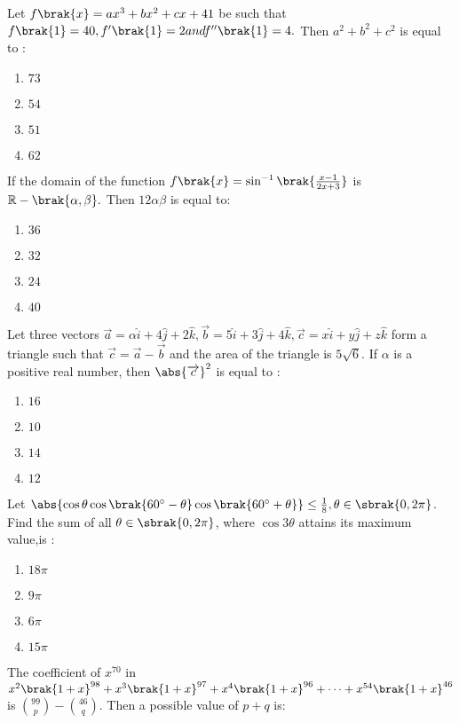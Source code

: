 \item Let $f\brak{x}=ax^3+bx^2+cx+41$ be such that $f\brak{1}=40, f'\brak{1}=2 and f''\brak{1}=4.$ Then $a^2+b^2+c^2$ is equal to : \hfill{}
     \begin{enumerate}
     \item $73$ \item $54$ \item $51$ \item $62$
     \end{enumerate}
\item If the domain of the function $f\brak{x}=\sin ^{-1} \brak{\frac{x-1}{2x+3}}$ is $\mathbb{R}-\brak{\alpha,\beta}.$ Then $12\alpha \beta$ is equal to: \hfill{}
     \begin{enumerate}
     \item $36$ \item $32$ \item $24$ \item $40$
     \end{enumerate}
\item Let three vectors $\overrightarrow{a}=\alpha \hat{i}+4\hat{j}+2\hat{k},\overrightarrow{b}=5\hat{i}+3\hat{j}+4\hat{k},\overrightarrow{c}=x\hat{i}+y\hat{j}+z\hat{k}$ form a triangle such that $\overrightarrow{c}=\overrightarrow{a}-\overrightarrow{b}$ and the area of the triangle is $5\sqrt{6}$. If $\alpha$ is a positive real number, then $\abs{\overrightarrow{c}}^2$ is equal to : \hfill{}
     \begin{enumerate}
     \item $16$ \item $10$ \item $14$ \item $12$
     \end{enumerate}
\item Let $\abs{\cos \theta \cos \brak{60^{\circ} -\theta} \cos \brak{60^{\circ} + \theta}} \leq \frac{1}{8}, \theta \in \sbrak{0,2\pi}$. Find the sum of  all $\theta \in \sbrak{0,2\pi}$, where $\cos 3 \theta $ attains its maximum value,is : \hfill{}
     \begin{enumerate}
     \item $18\pi$ \item $9\pi$ \item $6\pi$ \item $15\pi$
     \end{enumerate}
\item The coefficient of $x^{70}$ in $x^2\brak{1+x}^{98}+x^3\brak{1+x}^{97}+x^4\brak{1+x}^{96}+\cdots+x^{54}\brak{1+x}^{46}$ is $\binom{99}{p}-\binom{46}{q}$. Then a possible value of $p + q$ is: \hfill{}
